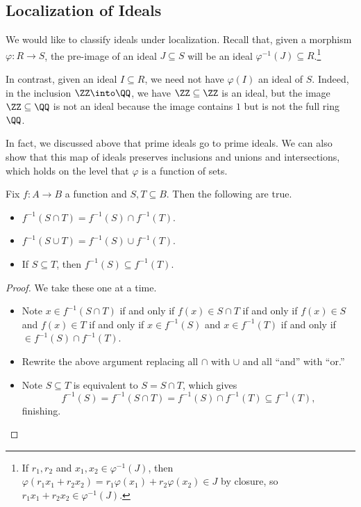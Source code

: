 \documentclass[../notes.tex]{subfiles}
\begin{document}
\subsection{Localization of Ideals}
We would like to classify ideals under localization. Recall that, given a morphism $\varphi:R\to S$, the pre-image of an ideal $J\subseteq S$ will be an ideal $\varphi^{-1}(J)\subseteq R$.\footnote{If $r_1,r_2$ and $x_1,x_2\in\varphi^{-1}(J)$, then $\varphi(r_1x_1+r_2x_2)=r_1\varphi(x_1)+r_2\varphi(x_2)\in J$ by closure, so $r_1x_1+r_2x_2\in\varphi^{-1}(J)$.}
\begin{remark}
	In contrast, given an ideal $I\subseteq R$, we need not have $\varphi(I)$ an ideal of $S$. Indeed, in the inclusion $\ZZ\into\QQ$, we have $\ZZ\subseteq\ZZ$ is an ideal, but the image $\ZZ\subseteq\QQ$ is not an ideal because the image contains $1$ but is not the full ring $\QQ$.
\end{remark}
In fact, we discussed above that prime ideals go to prime ideals. We can also show that this map of ideals preserves inclusions and unions and intersections, which holds on the level that $\varphi$ is a function of sets.
\begin{lemma}
	Fix $f:A\to B$ a function and $S,T\subseteq B$. Then the following are true.
	\begin{itemize}
		\item $f^{-1}(S\cap T)=f^{-1}(S)\cap f^{-1}(T)$.
		\item $f^{-1}(S\cup T)=f^{-1}(S)\cup f^{-1}(T)$.
		\item If $S\subseteq T$, then $f^{-1}(S)\subseteq f^{-1}(T)$.
	\end{itemize}
\end{lemma}
\begin{proof}
	We take these one at a time.
	\begin{itemize}
		\item Note $x\in f^{-1}(S\cap T)$ if and only if $f(x)\in S\cap T$ if and only if $f(x)\in S$ and $f(x)\in T$ if and only if $x\in f^{-1}(S)$ and $x\in f^{-1}(T)$ if and only if $\in f^{-1}(S)\cap f^{-1}(T)$.
		\item Rewrite the above argument replacing all $\cap$ with $\cup$ and all ``and'' with ``or.''
		\item Note $S\subseteq T$ is equivalent to $S=S\cap T$, which gives
		\[f^{-1}(S)=f^{-1}(S\cap T)=f^{-1}(S)\cap f^{-1}(T)\subseteq f^{-1}(T),\]
		finishing.
		\qedhere
	\end{itemize}
\end{proof}
\end{document}

